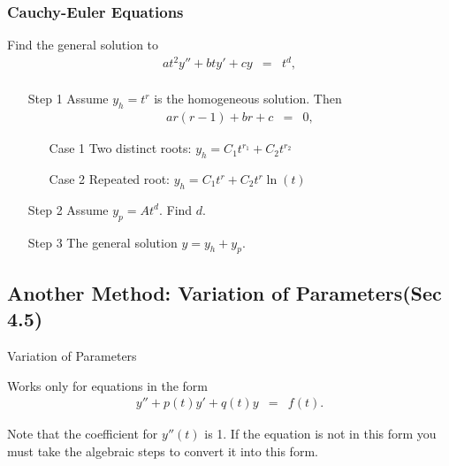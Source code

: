 \begin{frame}
  \frametitle{Cauchy-Euler Equations}

  Find the general solution to
  {\color{red}\begin{eqnarray*}
    a t^2 y''+ bt y' + c y  & = & t^d, \\
  \end{eqnarray*}}

  \begin{enumerate}
    \item[Step 1] Assume {\color{blue}$y_h=t^r$} is the homogeneous solution. Then 
    \begin{eqnarray*}
      ar(r-1) +br + c & = & 0, 
    \end{eqnarray*}
    \vspace{-0.5cm}
    \begin{enumerate}
    \item[Case 1] Two distinct roots:  
           {\color{orange}$y_h=C_1t^{r_1}+C_2t^{r_2}$} 
    \item[Case 2] Repeated root:  
            {\color{orange}$y_h=C_1t^{r}+C_2t^{r}\ln(t)$ }
    \end{enumerate}

    \item[Step 2] Assume {\color{blue}$y_p=At^d$}. Find $d$. 
    \item[Step 3] The general solution {\color{red}$y=y_h+y_p$}. 
   \end{enumerate}
 


\end{frame}


\subsection{Another Method: Variation of Parameters(Sec 4.5)}

\begin{frame}{Variation of Parameters}

  Works only for equations in the form
  \begin{eqnarray}\label{eqn1}
    y'' + p(t) y' + q(t) y & = & f(t).
  \end{eqnarray}

  Note that the coefficient for $y''(t)$ is 1. If the equation is not
  in this form you must take the algebraic steps to convert it into
  this form.
  
\end{frame}

